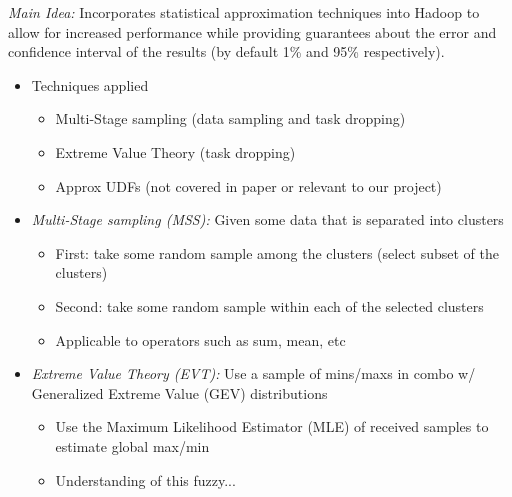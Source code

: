 \emph{Main Idea:} Incorporates statistical approximation techniques into
Hadoop to allow for increased performance while providing guarantees about
the error and confidence interval of the results (by default 1\% and 95\%
respectively).
\begin{itemize}

    \item Techniques applied
    \begin{itemize}
        \item Multi-Stage sampling (data sampling and task dropping)
        \item Extreme Value Theory (task dropping)
        \item Approx UDFs (not covered in paper or relevant to our project)
    \end{itemize}

    \item \emph{Multi-Stage sampling (MSS):} Given some data that is separated
      into clusters
    \begin{itemize}
        \item First: take some random sample among the clusters (select subset
          of the clusters)
        \item Second: take some random sample within each of the selected
          clusters
        \item Applicable to operators such as sum, mean, etc
    \end{itemize} 

    \item \emph{Extreme Value Theory (EVT):} Use a sample of mins/maxs in combo
      w/ Generalized Extreme Value (GEV) distributions
    \begin{itemize}
        \item Use the Maximum Likelihood Estimator (MLE) of received samples to
          estimate global max/min
        \item Understanding of this fuzzy...
    \end{itemize}


\end{itemize}
